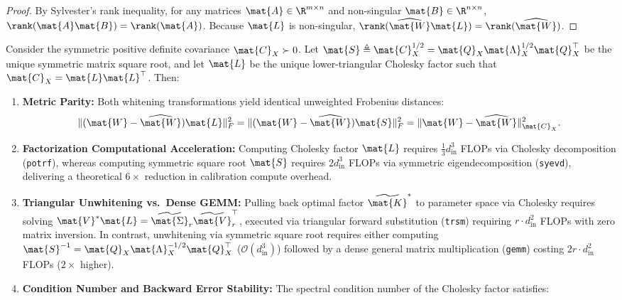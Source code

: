 \begin{proof}
By Sylvester's rank inequality, for any matrices $\mat{A} \in \R^{m \times n}$ and non-singular $\mat{B} \in \R^{n \times n}$, $\rank(\mat{A} \mat{B}) = \rank(\mat{A})$. Because $\mat{L}$ is non-singular, $\rank(\widehat{\mat{W}} \mat{L}) = \rank(\widehat{\mat{W}})$.
\end{proof}

\begin{lemma}
\label{lem:cholesky_vs_sqrt}
Consider the symmetric positive definite covariance $\mat{C}_X \succ 0$. Let $\mat{S} \triangleq \mat{C}_X^{1/2} = \mat{Q}_X \mat{\Lambda}_X^{1/2} \mat{Q}_X^\top$ be the unique symmetric matrix square root, and let $\mat{L}$ be the unique lower-triangular Cholesky factor such that $\mat{C}_X = \mat{L} \mat{L}^\top$. Then:
\begin{enumerate}
    \item \textbf{Metric Parity:} Both whitening transformations yield identical unweighted Frobenius distances:
    \begin{equation}
    \| (\mat{W} - \widehat{\mat{W}}) \mat{L} \|_F^2 = \| (\mat{W} - \widehat{\mat{W}}) \mat{S} \|_F^2 = \| \mat{W} - \widehat{\mat{W}} \|_{\mat{C}_X}^2.
    \label{eq:whitening_isometry_parity}
    \end{equation}
    \item \textbf{Factorization Computational Acceleration:} Computing Cholesky factor $\mat{L}$ requires $\frac{1}{3} d_{\text{in}}^3$ FLOPs via Cholesky decomposition (\texttt{potrf}), whereas computing symmetric square root $\mat{S}$ requires $2 d_{\text{in}}^3$ FLOPs via symmetric eigendecomposition (\texttt{syevd}), delivering a theoretical $6\times$ reduction in calibration compute overhead.
    \item \textbf{Triangular Unwhitening vs.\ Dense GEMM:} Pulling back optimal factor $\widetilde{\mat{K}}^*$ to parameter space via Cholesky requires solving $\mat{V}^* \mat{L} = \widetilde{\mat{\Sigma}}_r \widetilde{\mat{V}}_r^\top$, executed via triangular forward substitution (\texttt{trsm}) requiring $r \cdot d_{\text{in}}^2$ FLOPs with zero matrix inversion. In contrast, unwhitening via symmetric square root requires either computing $\mat{S}^{-1} = \mat{Q}_X \mat{\Lambda}_X^{-1/2} \mat{Q}_X^\top$ ($\mathcal{O}(d_{\text{in}}^3)$) followed by a dense general matrix multiplication (\texttt{gemm}) costing $2 r \cdot d_{\text{in}}^2$ FLOPs ($2\times$ higher).
    \item \textbf{Condition Number and Backward Error Stability:} The spectral condition number of the Cholesky factor satisfies:

\end{enumerate}
\end{lemma}
